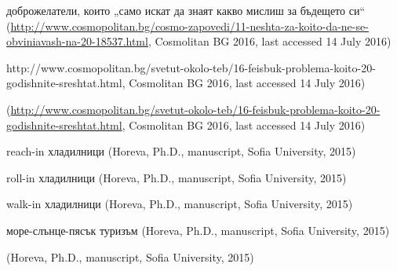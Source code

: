 \documentclass[output=paper]{LSP/langsci}
\begin{document}
\z




\z




\z


 {{доброжелатели, които „само искат да знаят какво мислиш за бъдещето си“}}{ (}\url{http://www.cosmopolitan.bg/cosmo-zapovedi/11-neshta-za-koito-da-ne-se-obviniavash-na-20-18537.html}{, Cosmolitan BG 2016, last accessed 14 July 2016)}

\z


http://www.cosmopolitan.bg/svetut-okolo-teb/16-feisbuk-problema-koito-20-godishnite-sreshtat.html{, Cosmolitan BG 2016, last accessed 14 July 2016)}


\z


 (\url{http://www.cosmopolitan.bg/svetut-okolo-teb/16-feisbuk-problema-koito-20-godishnite-sreshtat.html}, Cosmolitan BG 2016, last accessed 14 July 2016) \z



\ea%
    \label{ex:bagasheva:25} 

         {reach-in {хладилници} }(Horeva, Ph.D., manuscript, Sofia University, 2015)
    \z



\ea%
    \label{ex:bagasheva:26} 

         {roll-in {хладилници} }(Horeva, Ph.D., manuscript, Sofia University, 2015)
    \z



\ea%
    \label{ex:bagasheva:27} 

         {walk-in {хладилници} }(Horeva, Ph.D., manuscript, Sofia University, 2015)
    \z



\ea%
    \label{ex:bagasheva:28} 

         {{море-слънце-пясък туризъм} }(Horeva, Ph.D., manuscript, Sofia University,    2015)
    \z


(Horeva, Ph.D., manuscript, Sofia University, 2015)
\z

 

{\sloppy
\printbibliography[heading=subbibliography,notkeyword=this]
}
\end{document}
